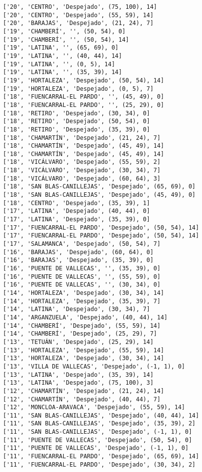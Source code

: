 \documentclass[11pt]{article}
\begin{document}
\begin{Verbatim}[commandchars=\\\{\}]
['20', 'CENTRO', 'Despejado', (75, 100), 14]
['20', 'CENTRO', 'Despejado', (55, 59), 14]
['20', 'BARAJAS', 'Despejado', (21, 24), 7]
['19', 'CHAMBERÍ', '', (50, 54), 0]
['19', 'CHAMBERÍ', '', (50, 54), 14]
['19', 'LATINA', '', (65, 69), 0]
['19', 'LATINA', '', (40, 44), 14]
['19', 'LATINA', '', (0, 5), 14]
['19', 'LATINA', '', (35, 39), 14]
['19', 'HORTALEZA', 'Despejado', (50, 54), 14]
['19', 'HORTALEZA', 'Despejado', (0, 5), 7]
['18', 'FUENCARRAL-EL PARDO', '', (45, 49), 0]
['18', 'FUENCARRAL-EL PARDO', '', (25, 29), 0]
['18', 'RETIRO', 'Despejado', (30, 34), 0]
['18', 'RETIRO', 'Despejado', (50, 54), 0]
['18', 'RETIRO', 'Despejado', (35, 39), 0]
['18', 'CHAMARTÍN', 'Despejado', (21, 24), 7]
['18', 'CHAMARTÍN', 'Despejado', (45, 49), 14]
['18', 'CHAMARTÍN', 'Despejado', (45, 49), 14]
['18', 'VICÁLVARO', 'Despejado', (55, 59), 2]
['18', 'VICÁLVARO', 'Despejado', (30, 34), 7]
['18', 'VICÁLVARO', 'Despejado', (60, 64), 3]
['18', 'SAN BLAS-CANILLEJAS', 'Despejado', (65, 69), 0]
['18', 'SAN BLAS-CANILLEJAS', 'Despejado', (45, 49), 0]
['18', 'CENTRO', 'Despejado', (35, 39), 1]
['17', 'LATINA', 'Despejado', (40, 44), 0]
['17', 'LATINA', 'Despejado', (35, 39), 0]
['17', 'FUENCARRAL-EL PARDO', 'Despejado', (50, 54), 14]
['17', 'FUENCARRAL-EL PARDO', 'Despejado', (50, 54), 14]
['17', 'SALAMANCA', 'Despejado', (50, 54), 7]
['16', 'BARAJAS', 'Despejado', (60, 64), 0]
['16', 'BARAJAS', 'Despejado', (35, 39), 0]
['16', 'PUENTE DE VALLECAS', '', (35, 39), 0]
['16', 'PUENTE DE VALLECAS', '', (55, 59), 0]
['16', 'PUENTE DE VALLECAS', '', (30, 34), 0]
['14', 'HORTALEZA', 'Despejado', (30, 34), 14]
['14', 'HORTALEZA', 'Despejado', (35, 39), 7]
['14', 'LATINA', 'Despejado', (30, 34), 7]
['14', 'ARGANZUELA', 'Despejado', (40, 44), 14]
['14', 'CHAMBERÍ', 'Despejado', (55, 59), 14]
['14', 'CHAMBERÍ', 'Despejado', (25, 29), 7]
['13', 'TETUÁN', 'Despejado', (25, 29), 14]
['13', 'HORTALEZA', 'Despejado', (55, 59), 14]
['13', 'HORTALEZA', 'Despejado', (30, 34), 14]
['13', 'VILLA DE VALLECAS', 'Despejado', (-1, 1), 0]
['13', 'LATINA', 'Despejado', (35, 39), 14]
['13', 'LATINA', 'Despejado', (75, 100), 3]
['12', 'CHAMARTÍN', 'Despejado', (21, 24), 14]
['12', 'CHAMARTÍN', 'Despejado', (40, 44), 7]
['12', 'MONCLOA-ARAVACA', 'Despejado', (55, 59), 14]
['11', 'SAN BLAS-CANILLEJAS', 'Despejado', (40, 44), 14]
['11', 'SAN BLAS-CANILLEJAS', 'Despejado', (35, 39), 2]
['11', 'SAN BLAS-CANILLEJAS', 'Despejado', (-1, 1), 0]
['11', 'PUENTE DE VALLECAS', 'Despejado', (50, 54), 0]
['11', 'PUENTE DE VALLECAS', 'Despejado', (-1, 1), 0]
['11', 'FUENCARRAL-EL PARDO', 'Despejado', (65, 69), 14]
['11', 'FUENCARRAL-EL PARDO', 'Despejado', (30, 34), 2]

\end{Verbatim}
\end{document}

